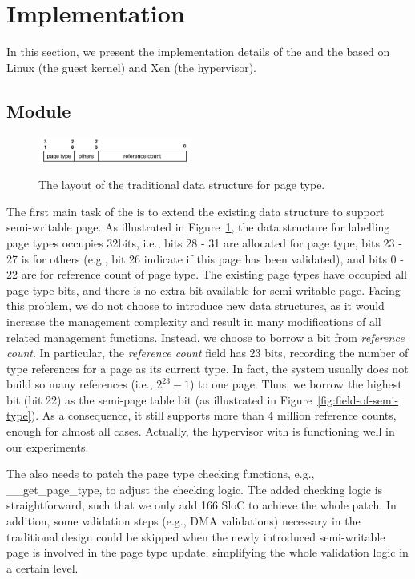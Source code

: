 \section{Implementation} \label{sec:impl}
In this section, we present the implementation details of the \module and the \cache based on Linux (the guest kernel) and Xen (the hypervisor).

\subsection{\name Module}
\begin{figure}[ht]
\centering
\includegraphics[width=0.45\textwidth]{image/implementation/field-of-page-type-info.jpg} \\
\caption{The layout of the traditional data structure for page type.}
\label{fig:field-of-page-type-info}
\end{figure}
The first main task of the \module is to extend the existing data structure to support semi-writable page.
As illustrated in Figure~\ref{fig:field-of-page-type-info}, the data structure for labelling page types occupies 32bits, i.e., bits 28 - 31 are allocated for page type, bits 23 - 27 is for others (e.g., bit 26 indicate if this page has been validated), and bits 0 - 22 are for reference count of page type.
The existing page types have occupied all page type bits, and there is no extra bit available for semi-writable page.
Facing this problem, we do not choose to introduce new data structures, as it would increase the management complexity and result in many modifications of all related management functions.
Instead, we choose to borrow a bit from \emph{reference count}.
In particular, the \emph{reference count} field has 23 bits, recording the number of type references for a page as its current type.
In fact, the system usually does not build so many references (i.e., $2^{23}-1$) to one page. Thus, we borrow the highest bit (bit 22) as the semi-page table bit (as illustrated in Figure~\ref{fig:field-of-semi-type}).
As a consequence, it still supports more than 4 million reference counts, enough for almost all cases.
Actually, the hypervisor with \name is functioning well in our experiments.

The \module also needs to patch the page type checking functions, e.g., \_\_get\_page\_type, to adjust the checking logic.
The added checking logic is straightforward, such that we only add 166 SloC to achieve the whole patch.
In addition, some validation steps (e.g., DMA validations) necessary in the traditional design could be skipped when the newly introduced semi-writable page is involved in the page type update, simplifying the whole validation logic in a certain level.

